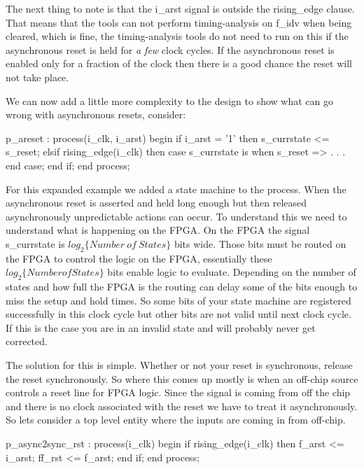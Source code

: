The next thing to note is that the i\_arst signal is outside the rising\_edge clause. That means that the tools can not perform timing-analysis on f\_idv when being cleared, which is fine, the timing-analysis tools do not need to run on this if the asynchronous reset is held for \emph{a few} clock cycles. If the asynchronous reset is enabled only for a fraction of the clock then there is a good chance the reset will not take place. 

We can now add a little more complexity to the design to show what can go wrong with asynchronous resets, consider:

\begin{VHDLlisting}[tabsize=4]
p_areset : process(i_clk, i_arst)
begin
    if i_arst = '1' then
        s_currstate <= s_reset;
    elsif rising_edge(i_clk) then
        case s_currstate is
            when s_reset => 
            .
            .
            .
        end case;
    end if;
end process;
\end{VHDLlisting}

For this expanded example we added a state machine to the process. When the asynchronous reset is asserted and held long enough but then released asynchronously unpredictable actions can occur. To understand this we need to understand what is happening on the \ac{FPGA}. On the \ac{FPGA} the signal s\_currstate is $log_2\{Number~of~States\}$ bits wide. Those bits must be routed on the \ac{FPGA} to control the logic on the \ac{FPGA}, essentially these $log_2\{Number of States\}$ bits enable logic to evaluate. Depending on the number of states and how full the \ac{FPGA} is the routing can delay some of the bits enough to miss the setup and hold times. So some bits of your state machine are registered successfully in this clock cycle but other bits are not valid until next clock cycle. If this is the case you are in an invalid state and will probably never get corrected. 

The solution for this is simple. Whether or not your reset is synchronous, release the reset synchronously. So where this comes up mostly is when an off-chip source controls a reset line for \ac{FPGA} logic. Since the signal is coming from off the chip and there is no clock associated with the reset we have to treat it asynchronously. So lets consider a top level entity where the inputs are coming in from off-chip. 

\begin{VHDLlisting}[tabsize=4]
p_async2sync_rst : process(i_clk)
begin
    if rising_edge(i_clk) then
        f_arst <= i_arst;
        ff_rst <= f_arst;
    end if;
end process;
\end{VHDLlisting}
		
